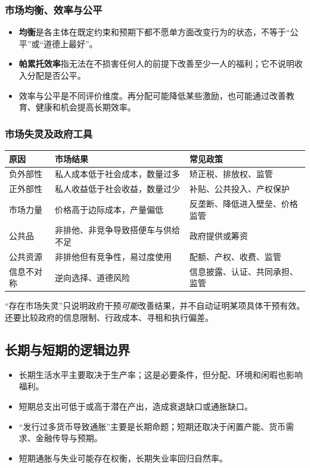 \documentclass[UTF8,11pt,a4paper]{ctexart}
\newcommand{\term}[1]{\textbf{#1}}
\begin{document}
\subsubsection{市场均衡、效率与公平}
\begin{itemize}
  \item \term{均衡}是各主体在既定约束和预期下都不愿单方面改变行为的状态，不等于“公平”或“道德上最好”。
  \item \term{帕累托效率}指无法在不损害任何人的前提下改善至少一人的福利；它不说明收入分配是否公平。
  \item 效率与公平是不同评价维度。再分配可能降低某些激励，也可能通过改善教育、健康和机会提高长期效率。
\end{itemize}

\subsubsection{市场失灵及政府工具}
\begin{longtable}{p{}p{}p{}}
\toprule
原因 & 市场结果 & 常见政策\\
\midrule
负外部性 & 私人成本低于社会成本，数量过多 & 矫正税、排放权、监管\\
正外部性 & 私人收益低于社会收益，数量过少 & 补贴、公共投入、产权保护\\
市场力量 & 价格高于边际成本，产量偏低 & 反垄断、降低进入壁垒、价格监管\\
公共品 & 非排他、非竞争导致搭便车与供给不足 & 政府提供或筹资\\
公共资源 & 非排他但有竞争性，易过度使用 & 配额、产权、收费、监管\\
信息不对称 & 逆向选择、道德风险 & 信息披露、认证、共同承担、监管\\
\bottomrule
\end{longtable}

\begin{warningbox}[常见错误]
“存在市场失灵”只说明政府干预\emph{可能}改善结果，并不自动证明某项具体干预有效。还要比较政府的信息限制、行政成本、寻租和执行偏差。
\end{warningbox}

\subsection{长期与短期的逻辑边界}
\begin{itemize}
  \item 长期生活水平主要取决于生产率；这是必要条件，但分配、环境和闲暇也影响福利。
  \item 短期总支出可低于或高于潜在产出，造成衰退缺口或通胀缺口。
  \item “发行过多货币导致通胀”主要是长期命题；短期还取决于闲置产能、货币需求、金融传导与预期。
  \item 短期通胀与失业可能存在权衡，长期失业率回归自然率。
\end{itemize}
\end{document}
